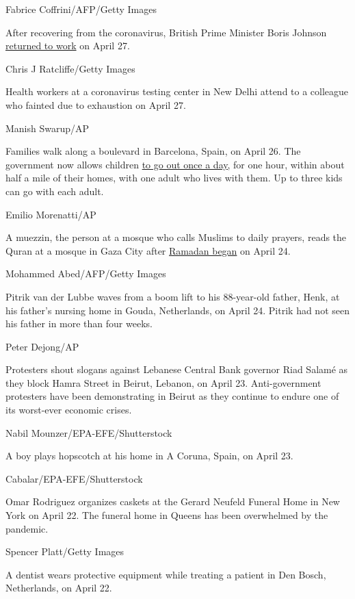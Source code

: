 Fabrice Coffrini/AFP/Getty Images

After recovering from the coronavirus, British Prime Minister Boris
Johnson
\href{https://edition.cnn.com/2020/04/27/uk/boris-johnson-downing-street-speech-return-intl-gbr/index.html}{returned
to work} on April 27.

Chris J Ratcliffe/Getty Images

Health workers at a coronavirus testing center in New Delhi attend to a
colleague who fainted due to exhaustion on April 27.

Manish Swarup/AP

Families walk along a boulevard in Barcelona, Spain, on April 26. The
government now allows children
\href{https://www.cnn.com/world/live-news/coronavirus-pandemic-04-26-20-intl/h_7d4e57bbfadc52a651f777cc7cff219c}{to
go out once a day,} for one hour, within about half a mile of their
homes, with one adult who lives with them. Up to three kids can go with
each adult.

Emilio Morenatti/AP

A muezzin, the person at a mosque who calls Muslims to daily prayers,
reads the Quran at a mosque in Gaza City after
\href{http://www.cnn.com/2020/04/23/world/gallery/ramadan-2020/index.html}{Ramadan
began} on April 24.

Mohammed Abed/AFP/Getty Images

Pitrik van der Lubbe waves from a boom lift to his 88-year-old father,
Henk, at his father's nursing home in Gouda, Netherlands, on April 24.
Pitrik had not seen his father in more than four weeks.

Peter Dejong/AP

Protesters shout slogans against Lebanese Central Bank governor Riad
Salamé as they block Hamra Street in Beirut, Lebanon, on April 23.
Anti-government protesters have been demonstrating in Beirut as they
continue to endure one of its worst-ever economic crises.

Nabil Mounzer/EPA-EFE/Shutterstock

A boy plays hopscotch at his home in A Coruna, Spain, on April 23.

Cabalar/EPA-EFE/Shutterstock

Omar Rodriguez organizes caskets at the Gerard Neufeld Funeral Home in
New York on April 22. The funeral home in Queens has been overwhelmed by
the pandemic.

Spencer Platt/Getty Images

A dentist wears protective equipment while treating a patient in Den
Bosch, Netherlands, on April 22.

